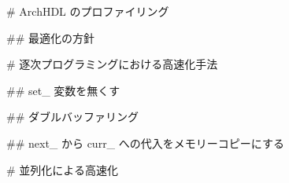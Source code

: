 # ArchHDL のプロファイリング





## 最適化の方針







# 逐次プログラミングにおける高速化手法






## set_ 変数を無くす





## ダブルバッファリング






## next_ から curr_ への代入をメモリーコピーにする







# 並列化による高速化









